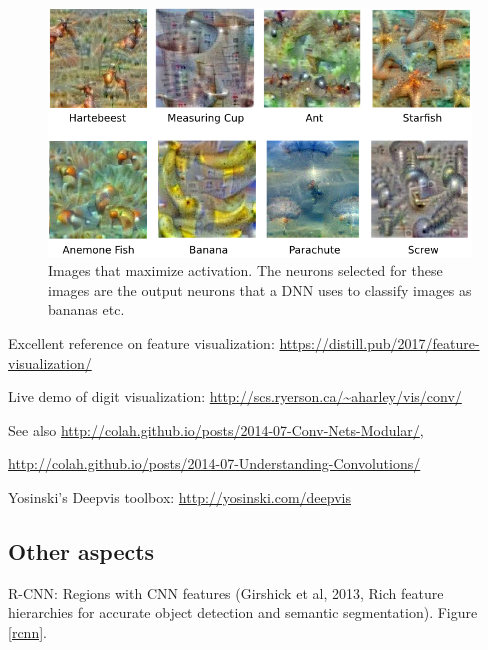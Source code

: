\documentclass[english]{article}
\begin{document}
\begin{figure}
  \centering
  \includegraphics[scale=0.7]{vis.png}
    \caption{Images that maximize activation. The neurons selected for these images are the output neurons that a DNN uses to classify images as bananas etc.}
    \label{vis}
\end{figure}

\item Excellent reference on feature visualization: \url{https://distill.pub/2017/feature-visualization/}

Live demo of digit visualization: \url{http://scs.ryerson.ca/~aharley/vis/conv/}


\item See also \url{http://colah.github.io/posts/2014-07-Conv-Nets-Modular/}, 

\url{http://colah.github.io/posts/2014-07-Understanding-Convolutions/}

Yosinski's Deepvis toolbox: \url{http://yosinski.com/deepvis}
\eenum



\subsection{Other aspects}
\benum
\item R-CNN: Regions with CNN features (Girshick et al, 2013, Rich feature hierarchies for accurate object detection and semantic segmentation). Figure \ref{rcnn}.
\end{document}
